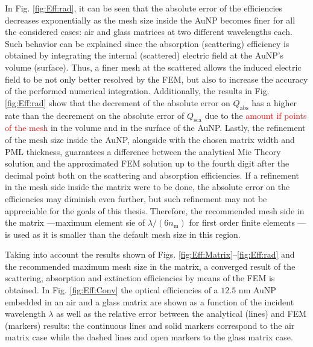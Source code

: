 In Fig. \ref{fig:Eff:rad}, it can be seen that the absolute error of the efficiencies decreases exponentially as the mesh size inside the AuNP becomes finer for all the considered cases: air and glass matrices at two different wavelengths each. Such behavior can be explained since the absorption (scattering) efficiency is obtained by integrating the internal (scattered) electric field at the AuNP's volume (surface). Thus, a finer mesh at the scattered allows the induced electric field to be not only better resolved by the FEM, but also to increase the accuracy of the performed numerical integration. Additionally,  the results in Fig. \ref{fig:Eff:rad} show that the decrement of the absolute error on $Q_\text{abs}$ has a higher rate than the decrement on the absolute error of $Q_\text{sca}$ due to the \textcolor{red}{amount if points of the mesh} in the volume and in the surface of the AuNP. Lastly, the refinement of the mesh size inside the AuNP, alongside with the chosen matrix width and PML thickness, guarantees a difference between the analytical Mie Theory solution and the approximated FEM solution up to the fourth digit after the decimal point both on the scattering and absorption efficiencies. If a refinement in the mesh side inside the matrix were to be done, the absolute error on the efficiencies may diminish even further, but such refinement may not be appreciable for the goals of this thesis. Therefore, the recommended mesh side in the matrix ---maximum element sie of $\lambda/(6n_\text{m})$ for first order finite elements \cite{comsol_doc}--- is used as it is smaller than the default mesh size in this region.

Taking into account the results shown of Figs. \ref{fig:Eff:Matrix}--\ref{fig:Eff:rad} and the recommended maximum mesh size in the matrix, a converged result of the scattering, absorption and extinction efficiencies by means of the FEM is obtained. In Fig. \ref{fig:Eff:Conv} the optical efficiencies of a $12.5$ nm AuNP embedded in an air and a glass matrix are shown as a function of the incident wavelength $\lambda$ as well as the relative error between the analytical (lines) and FEM (markers) results: the continuous lines and solid markers correspond to the air matrix case while  the dashed lines and open markers to the glass matrix case.

